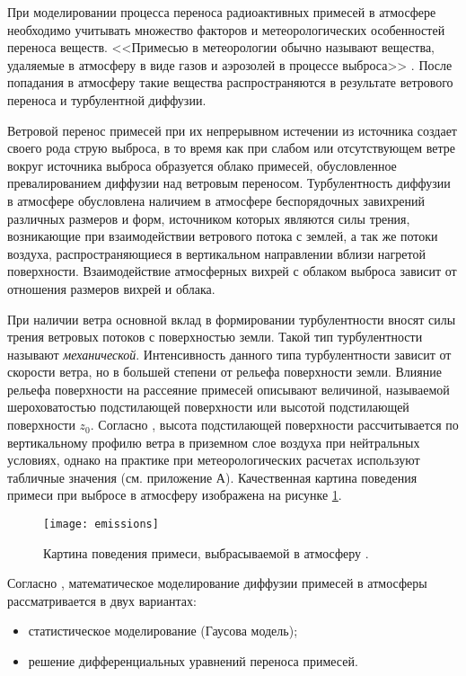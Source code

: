 При моделировании процесса переноса радиоактивных примесей в атмосфере необходимо учитывать множество факторов и 
метеорологических особенностей переноса веществ. <<Примесью в метеорологии обычно называют вещества, удаляемые в 
атмосферу в виде газов и  аэрозолей в процессе выброса>> \cite[с. 52]{gusev_bio}. После попадания в атмосферу такие 
вещества распространяются в результате ветрового переноса и турбулентной диффузии. 

Ветровой перенос примесей при их непрерывном истечении из источника создает своего рода струю выброса, в то время как 
при слабом или отсутствующем ветре вокруг источника выброса образуется облако примесей, обусловленное превалированием 
диффузии над ветровым переносом. Турбулентность диффузии в атмосфере обусловлена наличием в атмосфере беспорядочных 
завихрений различных размеров и форм, источником которых являются силы трения, возникающие при взаимодействии ветрового 
потока с землей, а так же потоки воздуха, распространяющиеся в вертикальном направлении вблизи нагретой поверхности. 
Взаимодействие атмосферных вихрей с облаком выброса зависит от отношения размеров вихрей и облака. \cite{gusev_bio}

При наличии ветра основной вклад в формировании турбулентности вносят силы трения ветровых потоков с поверхностью земли. 
Такой тип турбулентности называют \textit{механической}. Интенсивность данного типа турбулентности зависит от скорости 
ветра, но в большей степени от рельефа поверхности земли. Влияние рельефа поверхности на рассеяние примесей описывают 
величиной, называемой шероховатостью подстилающей поверхности или высотой подстилающей поверхности $z_0$. Согласно 
\cite{setton, bizova_meteor, berlyand}, высота подстилающей поверхности рассчитывается по вертикальному профилю ветра в 
приземном слое воздуха при нейтральных условиях, однако на практике при метеорологических расчетах используют табличные 
значения \cite{mlyavaya} (см. приложение А). Качественная картина поведения примеси при выбросе в атмосферу изображена 
на рисунке \ref{fig_emissions}.

\begin{figure}[ht]
\centering
	\texttt{[image: emissions]}
	\captionsetup{justification=centering}
    \caption{Картина поведения примеси, выбрасываемой в атмосферу \cite{gusev_bio}.}
    \label{fig_emissions}
\end{figure}

Согласно \cite{gusev_bio}, математическое моделирование диффузии примесей в атмосферы рассматривается в двух вариантах: 
\begin{itemize}
	\item статистическое моделирование (Гаусова модель);
	\item решение дифференциальных уравнений переноса примесей.
\end{itemize}

